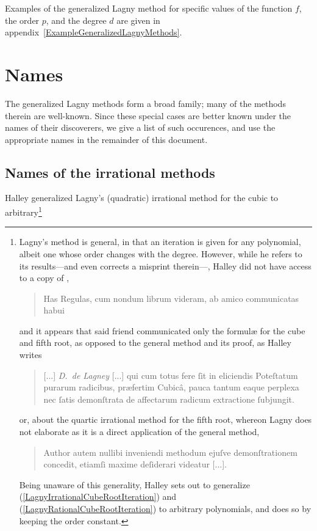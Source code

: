 ﻿\documentclass[10pt, a4paper, twoside]{basestyle}
\begin{document}
Examples of the generalized Lagny method for specific values of the function $f$, the order $p$, and the degree $d$
are given in appendix~\ref{ExampleGeneralizedLagnyMethods}.

\section*{Names}
The generalized Lagny methods form a broad family; many of the methods therein are well-known.
Since these special cases are better known under the names of their discoverers, we give a list of such
occurences, and use the appropriate names in the remainder of this document.
\subsection*{Names of the irrational methods}
Halley generalized Lagny's (quadratic) irrational method for the cubic to
arbitrary\footnote{%
Lagny's method is general, in that an iteration is given for any
polynomial, albeit one whose order changes with the degree. However, while he refers to its
results---and even corrects a misprint therein---, Halley
did not have access to a copy of \cite{FantetdeLagny1692},
\begin{quote}
Has Regulas, cum nondum librum videram, ab amico communicatas habui
\end{quote}
and it appears that said friend communicated only the formulæ for the cube and fifth root, as opposed to the
general method and its proof, as Halley writes
\begin{quote}
[...] \emph{D.~de Lagney} [...] qui cum totus fere ſit in eliciendis Poteſtatum purarum radicibus,
præfertim Cubicâ, pauca tantum eaque perplexa nec ſatis demonſtrata de affectarum radicum
extractione ſubjungit.
\end{quote}
or, about the quartic irrational method for the fifth root, whereon Lagny does not elaborate as
it is a direct application of the general method,
\begin{quote}
Author autem nullibi inveniendi methodum ejuſve demonſtrationem concedit,
etiamſi maxime deſiderari videatur [...].
\end{quote}
Being unaware of this generality, Halley sets out to generalize (\ref{LagnyIrrationalCubeRootIteration}) and (\ref{LagnyRationalCubeRootIteration}) to
arbitrary polynomials, and does so by keeping the order constant.}
\end{document}
